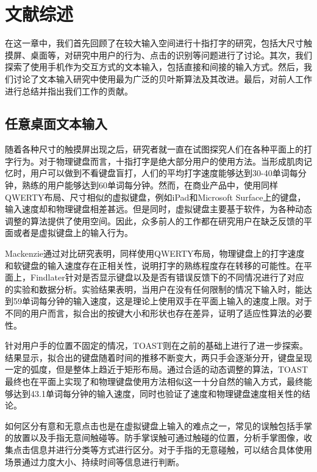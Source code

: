 \chapter{文献综述}
\label{cha:literature}
在这一章中，我们首先回顾了在较大输入空间进行十指打字的研究，包括大尺寸触摸屏、桌面等，对研究中用户的行为、点击的识别等问题进行了讨论。其次，我们探索了使用手机作为交互方式的文本输入，包括直接和间接的输入方式。然后，我们讨论了文本输入研究中使用最为广泛的贝叶斯算法及其改进。最后，对前人工作进行总结并指出我们工作的贡献。

\section{任意桌面文本输入} %
随着各种尺寸的触摸屏出现之后，研究者就一直在试图探究人们在各种平面上的打字行为。对于物理键盘而言，十指打字是绝大部分用户的使用方法。当形成肌肉记忆时，用户可以做到不看键盘盲打，人们的平均打字速度能够达到30-40单词每分钟，熟练的用户能够达到60单词每分钟\cite{flatglass2011findlater}。然而，在商业产品中，使用同样QWERTY布局、尺寸相似的虚拟键盘，例如iPad和Microsoft Surface上的键盘，输入速度却和物理键盘相差甚远。但是同时，虚拟键盘主要基于软件，为各种动态调整的算法提供了使用空间。因此，众多前人的工作都在研究用户在缺乏反馈的平面或者是虚拟键盘上的输入行为。

Mackenzie通过对比研究表明\cite{mackenzie2001empirical}，同样使用QWERTY布局，物理键盘上的打字速度和软键盘的输入速度存在正相关性，说明打字的熟练程度存在转移的可能性。在平面上，Findlater针对是否显示键盘以及是否有错误反馈下的不同情况进行了对应的实验和数据分析\cite{flatglass2011findlater}。实验结果表明，当用户在没有任何限制的情况下输入时，能达到59单词每分钟的输入速度，这是理论上使用双手在平面上输入的速度上限。对于不同的用户而言，拟合出的按键大小和形状也存在差异，证明了适应性算法的必要性。

针对用户手的位置不固定的情况，TOAST\cite{2018shitoast}则在之前的基础上进行了进一步探索。结果显示，拟合出的键盘随着时间的推移不断变大，两只手会逐渐分开，键盘呈现一定的弧度，但是整体上趋近于矩形布局。通过合适的动态调整的算法，TOAST\cite{2018shitoast}最终也在平面上实现了和物理键盘使用方法相似这一十分自然的输入方式，最终能够达到43.1单词每分钟的输入速度，同时也验证了速度和物理键盘速度相关性的结论\cite{mackenzie2001empirical}。


如何区分有意和无意点击也是在虚拟键盘上输入的难点之一，常见的误触包括手掌的放置以及手指无意间触碰等。防手掌误触可通过触碰的位置\cite{2018shitoast}，分析手掌图像\cite{ewerling2012finger}，收集点击信息并进行分类\cite{schwarz2014probabilistic}等方式进行区分。对于手指的无意碰触，可以结合具体使用场景通过力度大小、持续时间等信息进行判断。

